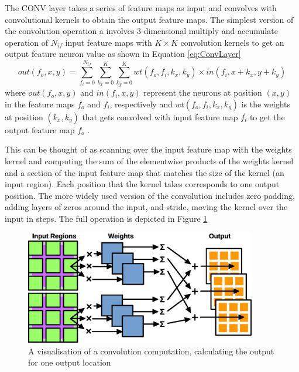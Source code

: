 \documentclass[12pt]{article}
\begin{document}
The CONV layer takes a series of feature maps as input and convolves with convolutional kernels to obtain the output feature maps. The simplest version of the convolution operation a involves 3-dimensional multiply and accumulate operation of $N_{if}$ input feature maps with $K\times K$ convolution kernels to get an output feature neuron value as shown in Equation \ref{eq:ConvLayer}
\begin{equation}
out(f_o,x,y)=\sum^{N_{if}}_{f_i=0} \sum^{K}_{k_x=0} \sum^{K}_{k_y=0} wt(f_o,f_i,k_x,k_y)\times in(f_i,x+k_x,y+k_y)
\label{eq:ConvLayer}
\end{equation}
where $out(f_o,x,y)$ and $in(f_i,x,y)$ represent the neurons at position $(x,y)$ in the feature maps $f_o$ and $f_i$, respectively and $wt(f_o,f_i,k_x,k_y)$ is the weights at position $(k_x,k_y)$ that gets convolved with input feature map $f_i$ to get the output feature map $f_o$ \cite{SudaFpgaAccelerator}.

This can be thought of as scanning over the input feature map with the weights kernel and computing the sum of the elementwise products of the weights kernel and a section of the input feature map that matches the size of the kernel (an input region). Each position that the kernel takes corresponds to one output position. The more widely used version of the convolution includes zero padding, adding layers of zeros around the input, and stride, moving the kernel over the input in steps. The full operation is depicted in Figure \ref{fig:conv}

\begin{figure}[h]
\centering
\includegraphics[width=0.9\textwidth]{figures/conv.eps}
\caption{A visualisation of a convolution computation, calculating the output for one output location}
\label{fig:conv}
\end{figure}
\end{document}
